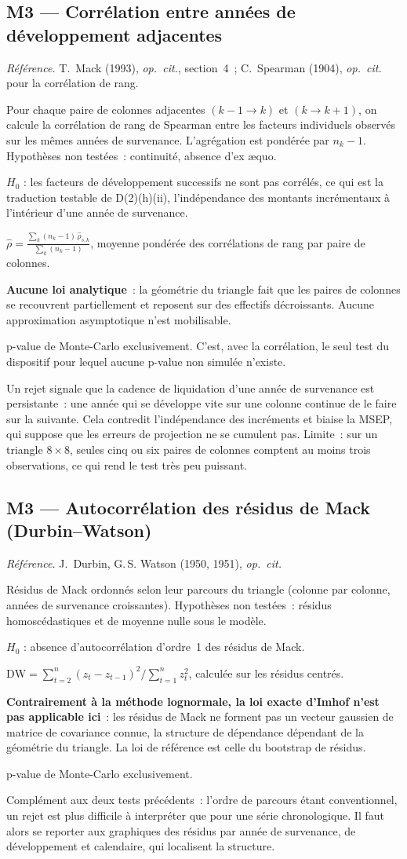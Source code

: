 \documentclass[a4paper,11pt]{article}
\newcommand{\refl}[1]{{\small\textcolor{maincolor!70!black}{\textit{Référence.} #1}}\par\smallskip}
\newcounter{ficheid}
\newenvironment{fiche}[1]{%
  \stepcounter{ficheid}%
  \phantomsection
  \subsection{#1}%
  \label{fiche:\theficheid}%
}{%
  \end{description}\vspace{0.5em}%
}
\newcommand{\Cadre}{%
  \begin{description}[leftmargin=0pt, style=unboxed, itemsep=3pt, topsep=3pt, parsep=2pt]%
  \item[\textcolor{financeblue}{\textbf{1. Cadre, notations et hypothèses de validité (non testées).}}]}
\newcommand{\Hzero}{\item[\textcolor{financeblue}{\textbf{2. Hypothèse nulle.}}]}
\newcommand{\Stat}{\item[\textcolor{financeblue}{\textbf{3. Statistique de test.}}]}
\newcommand{\Loi}{\item[\textcolor{financeblue}{\textbf{4. Loi sous $H_0$.}}]}
\newcommand{\Pval}{\item[\textcolor{financeblue}{\textbf{5. p-value.}}]}
\newcommand{\Usage}{\item[\textcolor{financeblue}{\textbf{6. Usage et limites.}}]}
\begin{document}
\begin{fiche}{M3 --- Corrélation entre années de développement adjacentes}
\label{mw:m3cor}
\refl{T.~Mack (1993), \emph{op.\ cit.}, section~4~; C.~Spearman (1904),
\emph{op.\ cit.} pour la corrélation de rang.}
\Cadre
Pour chaque paire de colonnes adjacentes $(k-1 \to k)$ et $(k \to k+1)$, on
calcule la corrélation de rang de Spearman entre les facteurs individuels
observés sur les mêmes années de survenance. L'agrégation est pondérée par
$n_k - 1$. Hypothèses non testées~: continuité, absence d'ex \ae quo.
\Hzero
$H_0$ : les facteurs de développement successifs ne sont pas corrélés, ce qui
est la traduction testable de D(2)(h)(ii), l'indépendance des montants
incrémentaux à l'intérieur d'une année de survenance.
\Stat
$\displaystyle \hat\rho = \frac{\sum_k (n_k-1)\,\hat\rho_{s,k}}{\sum_k (n_k-1)}$,
moyenne pondérée des corrélations de rang par paire de colonnes.
\Loi
\textbf{Aucune loi analytique}~: la géométrie du triangle fait que les paires de
colonnes se recouvrent partiellement et reposent sur des effectifs décroissants.
Aucune approximation asymptotique n'est mobilisable.
\Pval
p-value de Monte-Carlo exclusivement. C'est, avec la corrélation, le seul test
du dispositif pour lequel aucune p-value non simulée n'existe.
\Usage
Un rejet signale que la cadence de liquidation d'une année de survenance est
persistante~: une année qui se développe vite sur une colonne continue de le
faire sur la suivante. Cela contredit l'indépendance des incréments et biaise la
MSEP, qui suppose que les erreurs de projection ne se cumulent pas. Limite~: sur
un triangle $8\times8$, seules cinq ou six paires de colonnes comptent au moins
trois observations, ce qui rend le test très peu puissant.
\end{fiche}

\begin{fiche}{M3 --- Autocorrélation des résidus de Mack (Durbin--Watson)}
\label{mw:m3dw}
\refl{J.~Durbin, G.\,S. Watson (1950, 1951), \emph{op.\ cit.}}
\Cadre
Résidus de Mack ordonnés selon leur parcours du triangle (colonne par colonne,
années de survenance croissantes). Hypothèses non testées~: résidus
homoscédastiques et de moyenne nulle sous le modèle.
\Hzero
$H_0$ : absence d'autocorrélation d'ordre~1 des résidus de Mack.
\Stat
$\mathrm{DW} = \sum_{t=2}^{n}(z_t - z_{t-1})^2 / \sum_{t=1}^{n} z_t^2$, calculée
sur les résidus centrés.
\Loi
\textbf{Contrairement à la méthode lognormale, la loi exacte d'Imhof n'est pas
applicable ici}~: les résidus de Mack ne forment pas un vecteur gaussien de
matrice de covariance connue, la structure de dépendance dépendant de la
géométrie du triangle. La loi de référence est celle du bootstrap de résidus.
\Pval
p-value de Monte-Carlo exclusivement.
\Usage
Complément aux deux tests précédents~: l'ordre de parcours étant conventionnel,
un rejet est plus difficile à interpréter que pour une série chronologique. Il
faut alors se reporter aux graphiques des résidus par année de survenance, de
développement et calendaire, qui localisent la structure.
\end{fiche}
\end{document}
